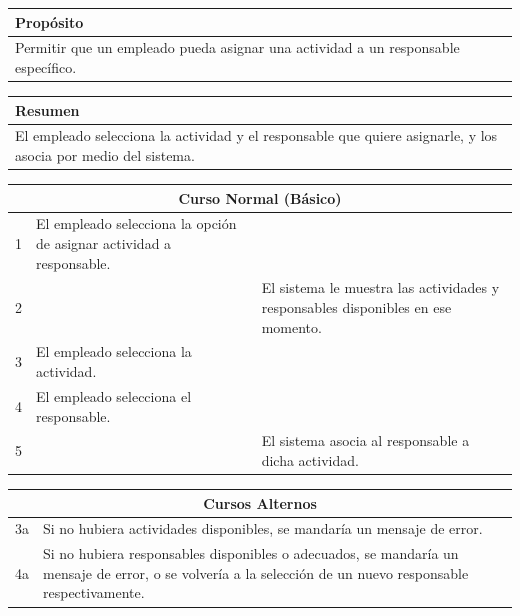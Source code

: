 \vspace{0.2cm}

\begin{table}[h!]
\centering
\begin{tabularx}{\textwidth}{|X|}
\hline
\cellcolor[HTML]{F2F2F2}\textbf{Propósito} \\ \hline
Permitir que un empleado pueda asignar una actividad a un responsable específico. \\ \hline
\end{tabularx}
\end{table}

\vspace{0.2cm}

\begin{table}[h!]
\centering
\begin{tabularx}{\textwidth}{|X|}
\hline
\cellcolor[HTML]{F2F2F2}\textbf{Resumen} \\ \hline
El empleado selecciona la actividad y el responsable que quiere asignarle, y los asocia por medio del sistema. \\ \hline
\end{tabularx}
\end{table}

\vspace{0.2cm}

\begin{table}[h!]
\centering
\begin{tabularx}{\textwidth}{|c|X|X|}
\hline
\multicolumn{3}{|c|}{\cellcolor[HTML]{F2F2F2}\textbf{Curso Normal (Básico)}} \\ \hline
1 & El empleado selecciona la opción de asignar actividad a responsable. & \\ \hline
2 & & El sistema le muestra las actividades y responsables disponibles en ese momento. \\ \hline
3 & El empleado selecciona la actividad. & \\ \hline
4 & El empleado selecciona el responsable. & \\ \hline
5 & & El sistema asocia al responsable a dicha actividad. \\ \hline
\end{tabularx}
\end{table}

\vspace{0.2cm}

\begin{table}[h!]
\centering
\begin{tabularx}{\textwidth}{|c|X|}
\hline
\multicolumn{2}{|c|}{\cellcolor[HTML]{F2F2F2}\textbf{Cursos Alternos}} \\ \hline
3a & Si no hubiera actividades disponibles, se mandaría un mensaje de error. \\ \hline
4a & Si no hubiera responsables disponibles o adecuados, se mandaría un mensaje de error, o se volvería a la selección de un nuevo responsable respectivamente. \\ \hline
\end{tabularx}
\end{table}

